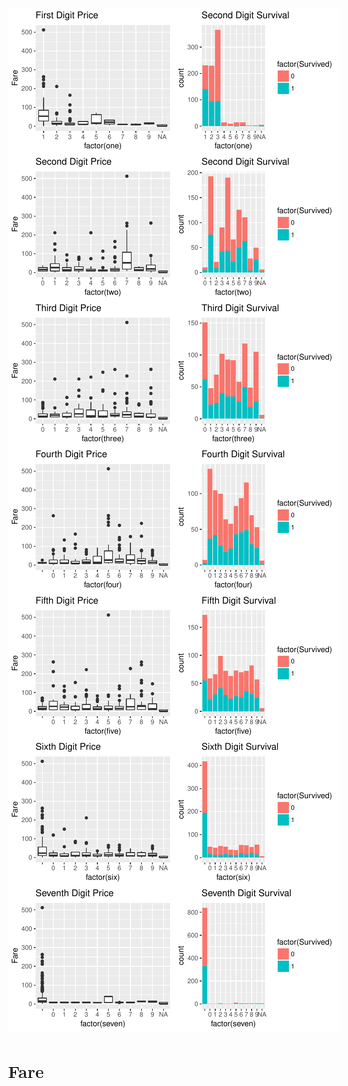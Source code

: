 \documentclass[]{article}
\begin{document}
\includegraphics{titanicDataClean_files/figure-latex/plot2-1.pdf}

\subsubsection{Fare}\label{fare}
\end{document}
